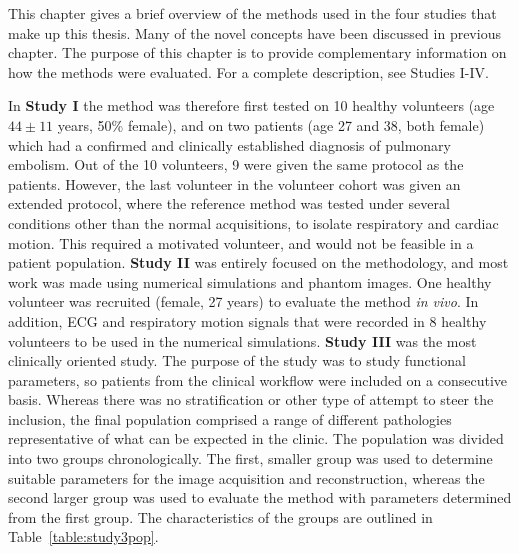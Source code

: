 This chapter gives a brief overview of the methods used in the four studies that make up this thesis. Many of the novel concepts have been discussed in previous chapter. The purpose of this chapter is to provide complementary information on how the methods were evaluated. For a complete description, see Studies I-IV.

 In \textbf{Study I} the method was therefore first tested on 10 healthy volunteers (age $44\pm11$ years, 50\% female), and on two patients (age 27 and 38, both female) which had a confirmed and clinically established diagnosis of pulmonary embolism. Out of the 10 volunteers, 9 were given the same protocol as the patients. However, the last volunteer in the volunteer cohort was given an extended protocol, where the reference method was tested under several conditions other than the normal acquisitions, to isolate respiratory and cardiac motion. This required a motivated volunteer, and would not be feasible in a patient population. \textbf{Study II} was entirely focused on the methodology, and most work was made using numerical simulations and phantom images. One healthy volunteer was recruited (female, 27 years) to evaluate the method \emph{in vivo}. In addition, ECG and respiratory motion signals that were recorded in 8 healthy volunteers to be used in the numerical simulations. \textbf{Study III} was the most clinically oriented study. The purpose of the study was to study functional parameters, so patients from the clinical workflow were included on a consecutive basis. Whereas there was no stratification or other type of attempt to steer the inclusion, the final population comprised a range of different pathologies representative of what can be expected in the clinic. The population was divided into two groups chronologically. The first, smaller group was used to determine suitable parameters for the image acquisition and reconstruction, whereas the second larger group was used to evaluate the method with parameters determined from the first group. The characteristics of the groups are outlined in Table~\ref{table:study3pop}.
